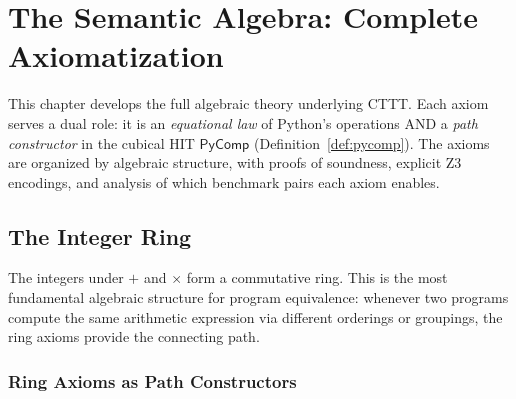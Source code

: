 \documentclass[11pt,a4paper]{report}
\theoremstyle{definition}
\theoremstyle{plain}
\begin{document}
\chapter{The Semantic Algebra: Complete Axiomatization}
\label{ch:axioms}

This chapter develops the full algebraic theory underlying CTTT.
Each axiom serves a dual role: it is an \emph{equational law} of
Python's operations AND a \emph{path constructor} in the cubical HIT
$\mathsf{PyComp}$ (Definition~\ref{def:pycomp}).  The axioms are
organized by algebraic structure, with proofs of soundness, explicit
Z3 encodings, and analysis of which benchmark pairs each axiom enables.

\section{The Integer Ring}

The integers under $+$ and $\times$ form a commutative ring.  This
is the most fundamental algebraic structure for program equivalence:
whenever two programs compute the same arithmetic expression via
different orderings or groupings, the ring axioms provide the
connecting path.

\subsection{Ring Axioms as Path Constructors}
\end{document}
